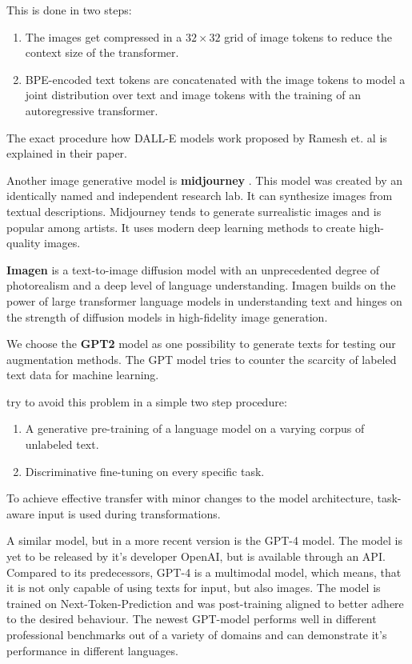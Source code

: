 \documentclass{article} %
\begin{document}
This is done in two steps:
 
\begin{enumerate}
	\item The images get compressed in a $32 \times 32$ grid of image tokens to reduce the context size of the transformer.
	\item BPE-encoded text tokens are concatenated with the image tokens to model a joint distribution over text and image tokens with the training of an autoregressive transformer.
\end{enumerate}

The exact procedure how DALL-E models work proposed by Ramesh et. al is explained in their paper. \cite{ramesh2021zeroshot}

Another image generative model is \textbf{midjourney} \cite{midjourney}. This model was created by an identically named and independent research lab. It can synthesize images from textual descriptions. Midjourney tends to generate surrealistic images and is popular among artists. It uses modern deep learning methods to create high-quality images.

\textbf{Imagen} is a text-to-image diffusion model with an unprecedented degree of photorealism and a deep level of language understanding. Imagen builds on the power of large transformer language models in understanding text and hinges on the strength of diffusion models in high-fidelity image generation. \cite{imagen, saharia2022photorealistic}

We choose the \textbf{GPT2} model as one possibility to generate texts for testing our augmentation methods. The GPT model tries to counter the scarcity of labeled text data for machine learning.

\cite{radford2019language} try to avoid this problem in a simple two step procedure:

\begin{enumerate}
	\item A generative pre-training of a language model on a varying corpus of unlabeled text.
	\item Discriminative fine-tuning on every specific task.
\end{enumerate}

To achieve effective transfer with minor changes to the model architecture, task-aware input is used during transformations. \cite{radford2018improving}

A similar model, but in a more recent version is the GPT-4 model. The model is yet to be released by it's developer OpenAI, but is available through an API. Compared to its predecessors, GPT-4 is a multimodal model, which means, that it is not only capable of using texts for input, but also images. The model is trained on Next-Token-Prediction and was post-training aligned to better adhere to the desired behaviour. The newest GPT-model performs well in different professional benchmarks out of a variety of domains and can demonstrate it's performance in different languages. \cite{openai2023gpt4}
\end{document}
